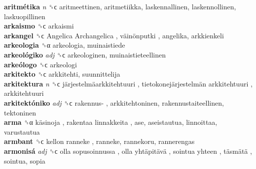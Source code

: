 \textbf{aritmétika} \emph{n}  ␝ϲ  aritmeettinen, aritmetiikka, laskennallinen, laskennollinen, laskuopillinen  \\
\textbf{arkaismo} ␝ϲ  arkaismi  \\
\textbf{arkangel} ␝ϲ   Angelica Archangelica ,  väinönputki , angelika, arkkienkeli  \\
\textbf{arkeologia} ␝α  arkeologia, muinaistiede  \\
\textbf{arkeológiko} \emph{adj}  ␝ϲ  arkeologinen, muinaistieteellinen  \\
\textbf{arkeólogo} ␝ϲ  arkeologi  \\
\textbf{arkitekto} ␝ϲ  arkkitehti, suunnittelija  \\
\textbf{arkitektura} \emph{n}  ␝ϲ   järjestelmäarkkitehtuuri ,  tietokonejärjestelmän arkkitehtuuri , arkkitehtuuri  \\
\textbf{arkitektóniko} \emph{adj}  ␝ϲ   rakennus- , arkkitehtoninen, rakennustaiteellinen, tektoninen  \\
\textbf{arma} ␝α   käsinoja ,  rakentaa linnakkeita , ase, aseistautua, linnoittaa, varustautua  \\
\textbf{armbant} ␝ϲ   kellon ranneke , ranneke, rannekoru, rannerengas  \\
\textbf{armonisá} \emph{adj}  ␝ϲ   olla sopusoinnussa ,  olla yhtäpitävä ,  sointua yhteen ,  täsmätä , sointua, sopia  \\
